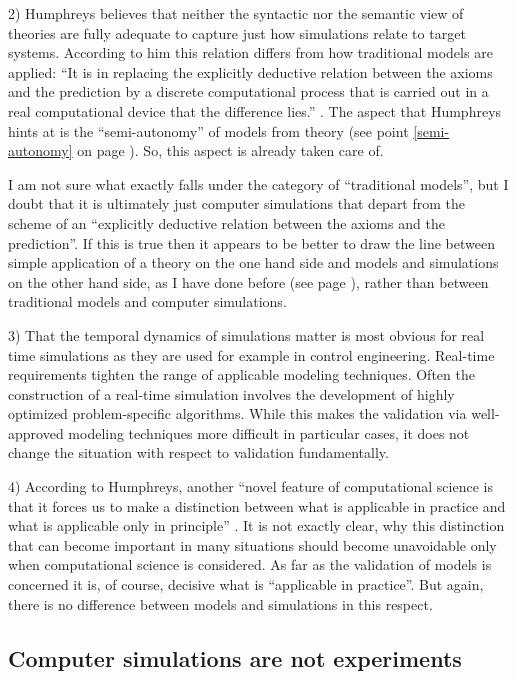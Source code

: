 \documentclass[onecollarge]{STJour}
\numberwithin{equation}{section}
\begin{document}
2) Humphreys believes that neither the syntactic nor the semantic view of
theories are fully adequate to capture just how simulations relate to
target systems. According to him this relation differs from how
traditional models are applied: ``It is in replacing the explicitly
deductive relation between the axioms and the prediction by a discrete
computational process that is carried out in a real computational device
that the difference lies.'' \citep[p.\ 620]{humphreys:2009}. The aspect
that Humphreys hints at is the ``semi-autonomy'' of models from theory
(see point \ref{semi-autonomy} on page \pageref{semi-autonomy}). So, this
aspect is already taken care of. 

I am not sure what exactly falls under the category of ``traditional
models'', but I doubt that it is ultimately just computer simulations
that depart from the scheme of an ``explicitly deductive relation between
the axioms and the prediction''. If this is true then it appears to be
better to draw the line between simple application of a theory on the one
hand side and models and simulations on the other hand side, as I have
done before (see page \pageref{simple-application}), rather than between
traditional models and computer simulations.

3) That the temporal dynamics of simulations matter is most obvious for
real time simulations as they are used for example in control
engineering. Real-time requirements tighten the range of applicable
modeling techniques. Often the construction of a real-time simulation
involves the development of highly optimized problem-specific algorithms.
While this makes the validation via well-approved modeling techniques
more difficult in particular cases, it does not change the situation with
respect to validation fundamentally.

4) According to Humphreys, another ``novel feature of computational
science is that it forces us to make a distinction between what is
applicable in practice and what is applicable only in principle''
\citep[p.\ 623]{humphreys:2009}. It is not exactly clear, why this
distinction that can become important in many situations should become
unavoidable only when computational science is considered. As far as
the validation of models is concerned it is, of course, decisive what
is ``applicable in practice''. But again, there is no difference
between models and simulations in this respect. 


\subsection{Computer simulations are not experiments}
\end{document}
